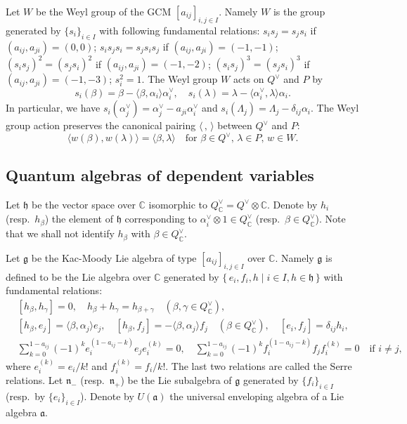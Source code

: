 \documentclass[12pt,twoside]{article}
\newcommand\bra{\langle}
\newcommand\ket{\rangle}
\newcommand\av{\alpha^\vee}
\newcommand\Qv{Q^\vee}
\newcommand\g{{\mathfrak g}}
\newcommand\h{{\mathfrak h}}
\newcommand\n{{\mathfrak n}}
\newcommand\C{{\mathbb C}} %
\theoremstyle{plain} %
\theoremstyle{definition} %
\theoremstyle{definition} %
\numberwithin{theorem}{section}
\numberwithin{equation}{section}
\numberwithin{figure}{section}
\numberwithin{table}{section}
\begin{document}
Let $W$ be the Weyl group of the GCM $[a_{ij}]_{i,j\in I}$.
Namely $W$ is the group generated by $\{s_i\}_{i\in I}$
with following fundamental relations:
$s_is_j=s_js_i$         if $(a_{ij},a_{ji})=(0,0)$;
$s_is_js_i=s_js_is_j$   if $(a_{ij},a_{ji})=(-1,-1)$;
$(s_is_j)^2=(s_js_i)^2$ if $(a_{ij},a_{ji})=(-1,-2)$;
$(s_is_j)^3=(s_js_i)^3$ if $(a_{ij},a_{ji})=(-1,-3)$;
$s_i^2=1$.
The Weyl group $W$ acts on $\Qv$ and $P$ by
\begin{equation*}
 s_i(\beta)=\beta-\bra\beta,\alpha_i\ket\av_i, \quad
 s_i(\lambda)=\lambda-\bra\av_i,\lambda\ket\alpha_i.
\end{equation*}
In particular, we have
$s_i(\av_j)=\av_j-a_{ji}\av_i$ and
$s_i(\Lambda_j)=\Lambda_j-\delta_{ij}\alpha_i$.
The Weyl group action preserves 
the canonical pairing $\bra\,,\,\ket$ between $\Qv$ and $P$:
\begin{equation*}
 \bra w(\beta),w(\lambda)\ket 
 = \bra\beta,\lambda\ket
 \quad
 \text{for $\beta\in\Qv$, $\lambda\in P$, $w\in W$}.
\end{equation*}


\subsection{Quantum algebras of dependent variables}
\label{sec:A}

Let $\h$ be the vector space over $\C$ isomorphic to $\Qv_\C=\Qv\otimes\C$.
Denote by $h_i$ (resp.\ $h_\beta$) 
the element of $\h$ corresponding to $\av_i\otimes1\in\Qv_\C$
(resp.\ $\beta\in\Qv_\C$).
Note that we shall not identify $h_\beta$ with $\beta\in\Qv_\C$.

Let $\g$ be the Kac-Moody Lie algebra of type $[a_{ij}]_{i,j\in I}$ 
over $\C$. Namely $\g$ is defined to be the Lie algebra over $\C$ 
generated by $\{\,e_i,f_i,h\mid i\in I, h\in\h \,\}$ with fundamental relations:
\begin{align*}
 &
 [h_\beta,h_\gamma] = 0, \quad h_\beta+h_\gamma=h_{\beta+\gamma} 
 \quad (\beta,\gamma\in\Qv_\C), 
 \\ &
 [h_\beta, e_j] =  \bra\beta,\alpha_j\ket e_j, \quad
 [h_\beta, f_j] = -\bra\beta,\alpha_j\ket f_j \quad (\beta\in\Qv_\C), \quad
 [e_i,f_j] = \delta_{ij}h_i,
 \\ &
 \sum_{k=0}^{1-a_{ij}} 
 (-1)^k e_i^{(1-a_{ij}-k)}e_je_i^{(k)} = 0,
 \quad
 \sum_{k=0}^{1-a_{ij}} 
 (-1)^k f_i^{(1-a_{ij}-k)}f_jf_i^{(k)} = 0
 \quad\text{if $i\ne j$},
\end{align*}
where $e_i^{(k)}=e_i/k!$ and $f_i^{(k)}=f_i/k!$.
The last two relations are called the Serre relations.
Let $\n_-$ (resp.\ $\n_+$) be 
the Lie subalgebra of $\g$ generated by $\{f_i\}_{i\in I}$
(resp.\ by $\{e_i\}_{i\in I}$).
Denote by $U(\mathfrak{a})$ the universal enveloping algebra of a Lie 
algebra $\mathfrak{a}$.
\end{document}
